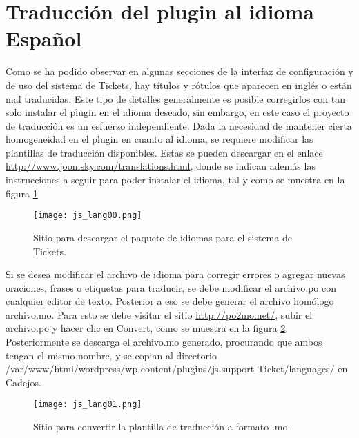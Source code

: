 \section{Traducción del plugin al idioma Español}
Como se ha podido observar en algunas secciones de la interfaz de configuración y de uso del sistema de Tickets, hay títulos y rótulos que aparecen en inglés o están mal traducidas. Este tipo de detalles generalmente es posible corregirlos con tan solo instalar el  plugin en el idioma deseado, sin embargo, en este caso el proyecto de traducción es un esfuerzo independiente. Dada la necesidad de mantener cierta homogeneidad en el plugin en cuanto al idioma, se requiere modificar las plantillas de traducción disponibles. Estas se pueden descargar en el enlace \url{http://www.joomsky.com/translations.html}, donde se indican además las instrucciones a seguir para poder instalar el idioma, tal y como se muestra en la figura \ref{fig:js:18}
\begin{figure}[H]
\centering
\texttt{[image: js\_lang00.png]}
\caption{Sitio para descargar el paquete de idiomas para el sistema de Tickets.}
\label{fig:js:18}
\end{figure}
Si se desea modificar el archivo de idioma para corregir errores o agregar nuevas oraciones, frases o etiquetas para traducir, se debe modificar el archivo.po  con cualquier editor de texto. Posterior a eso se debe generar el archivo homólogo archivo.mo. Para esto se debe visitar el sitio \url{http://po2mo.net/}, subir el archivo.po y hacer clic en Convert, como se muestra en la figura \ref{fig:js:19}. Posteriormente se descarga el archivo.mo generado, procurando que ambos tengan el mismo nombre, y se copian al directorio /var/www/html/wordpress/wp-content/plugins/js-support-Ticket/languages/ en Cadejos.

\begin{figure}[H]
\centering
\texttt{[image: js\_lang01.png]}
\caption{Sitio para convertir la plantilla de traducción a formato .mo.}
\label{fig:js:19}
\end{figure}

